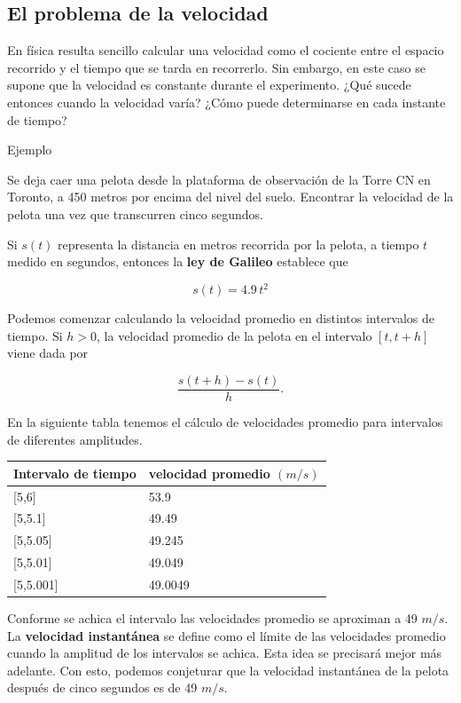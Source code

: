 \documentclass[
  letterpaper,
]{book}
\theoremstyle{plain}
\theoremstyle{remark}
\begin{document}
\subsection{El problema de la
velocidad}\label{el-problema-de-la-velocidad}

En física resulta sencillo calcular una velocidad como el cociente entre
el espacio recorrido y el tiempo que se tarda en recorrerlo. Sin
embargo, en este caso se supone que la velocidad es constante durante el
experimento. ¿Qué sucede entonces cuando la velocidad varía? ¿Cómo puede
determinarse en cada instante de tiempo?

Ejemplo

Se deja caer una pelota desde la plataforma de observación de la Torre
CN en Toronto, a 450 metros por encima del nivel del suelo. Encontrar la
velocidad de la pelota una vez que transcurren cinco segundos.

\begin{tcolorbox}[enhanced jigsaw, opacityback=0, left=2mm, opacitybacktitle=0.6, toprule=.15mm, bottomrule=.15mm, colbacktitle=quarto-callout-tip-color!10!white, titlerule=0mm, bottomtitle=1mm, title=\textcolor{quarto-callout-tip-color}{\faLightbulb}\hspace{0.5em}{Solución}, toptitle=1mm, colframe=quarto-callout-tip-color-frame, colback=white, breakable, rightrule=.15mm, arc=.35mm, leftrule=.75mm, coltitle=black]

Si \(s(t)\) representa la distancia en metros recorrida por la pelota, a
tiempo \(t\) medido en segundos, entonces la \textbf{ley de Galileo}
establece que

\[
s(t)=4.9\, t^2
\]

Podemos comenzar calculando la velocidad promedio en distintos
intervalos de tiempo. Si \(h>0\), la velocidad promedio de la pelota en
el intervalo \([t, t+h]\) viene dada por

\[
\frac{s(t+h)-s(t)}{h}.
\]

En la siguiente tabla tenemos el cálculo de velocidades promedio para
intervalos de diferentes amplitudes.

\begin{longtable}[]{@{}ll@{}}
\toprule\noalign{}
Intervalo de tiempo & velocidad promedio \((m/s)\) \\
\midrule\noalign{}
\endhead
\bottomrule\noalign{}
\endlastfoot
{[}5,6{]} & 53.9 \\
{[}5,5.1{]} & 49.49 \\
{[}5,5.05{]} & 49.245 \\
{[}5,5.01{]} & 49.049 \\
{[}5,5.001{]} & 49.0049 \\
\end{longtable}

Conforme se achica el intervalo las velocidades promedio se aproximan a
49 \(m/s\). La \textbf{velocidad instantánea} se define como el límite
de las velocidades promedio cuando la amplitud de los intervalos se
achica. Esta idea se precisará mejor más adelante. Con esto, podemos
conjeturar que la velocidad instantánea de la pelota después de cinco
segundos es de 49 \(m/s\).

\end{tcolorbox}
\end{document}
